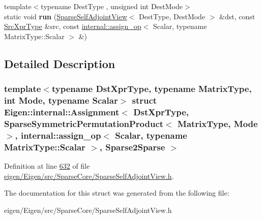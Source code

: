 \begin{DoxyCompactItemize}
\item 
\mbox{\label{struct_eigen_1_1internal_1_1_assignment_3_01_dst_xpr_type_00_01_sparse_symmetric_permutation_pro69955201e4d84b32d17d1959c46119e9_a743214fc5df8550054cff8aaefc5d0db}} 
{\footnotesize template$<$typename Dest\+Type , unsigned int Dest\+Mode$>$ }\\static void {\bfseries run} (\hyperlink{group___sparse_core___module_class_eigen_1_1_sparse_self_adjoint_view}{Sparse\+Self\+Adjoint\+View}$<$ Dest\+Type, Dest\+Mode $>$ \&dst, const \hyperlink{class_eigen_1_1_sparse_symmetric_permutation_product}{Src\+Xpr\+Type} \&src, const \hyperlink{struct_eigen_1_1internal_1_1assign__op}{internal\+::assign\+\_\+op}$<$ Scalar, typename Matrix\+Type\+::\+Scalar $>$ \&)
\end{DoxyCompactItemize}


\subsection{Detailed Description}
\subsubsection*{template$<$typename Dst\+Xpr\+Type, typename Matrix\+Type, int Mode, typename Scalar$>$\newline
struct Eigen\+::internal\+::\+Assignment$<$ Dst\+Xpr\+Type, Sparse\+Symmetric\+Permutation\+Product$<$ Matrix\+Type, Mode $>$, internal\+::assign\+\_\+op$<$ Scalar, typename Matrix\+Type\+::\+Scalar $>$, Sparse2\+Sparse $>$}



Definition at line \hyperlink{eigen_2_eigen_2src_2_sparse_core_2_sparse_self_adjoint_view_8h_source_l00632}{632} of file \hyperlink{eigen_2_eigen_2src_2_sparse_core_2_sparse_self_adjoint_view_8h_source}{eigen/\+Eigen/src/\+Sparse\+Core/\+Sparse\+Self\+Adjoint\+View.\+h}.



The documentation for this struct was generated from the following file\+:\begin{DoxyCompactItemize}
\item 
eigen/\+Eigen/src/\+Sparse\+Core/\+Sparse\+Self\+Adjoint\+View.\+h\end{DoxyCompactItemize}
